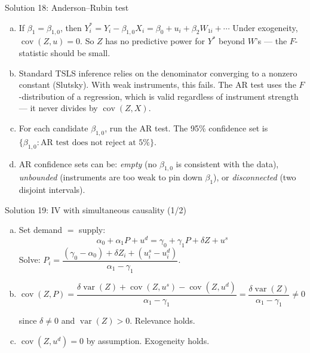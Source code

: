 \documentclass[10pt]{beamer}
\begin{document}
\begin{frame}{Solution 18: Anderson--Rubin test}
\label{s18}
\begin{enumerate}[(a)]
  \item If $\beta_1 = \beta_{1,0}$, then $Y_i^* = Y_i - \beta_{1,0}X_i = \beta_0 + u_i + \beta_2 W_{1i} + \cdots$ Under exogeneity, $\operatorname{cov}(Z, u) = 0$. So $Z$ has no predictive power for $Y^*$ beyond $W$'s --- the $F$-statistic should be small.

  \item Standard TSLS inference relies on the denominator converging to a nonzero constant (Slutsky). With weak instruments, this fails. The AR test uses the $F$-distribution of a regression, which is valid \alert{regardless} of instrument strength --- it never divides by $\operatorname{cov}(Z,X)$.

  \item For each candidate $\beta_{1,0}$, run the AR test. The 95\% confidence set is $\{\beta_{1,0} : \text{AR test does not reject at 5\%}\}$.

  \item AR confidence sets can be: \emph{empty} (no $\beta_{1,0}$ is consistent with the data), \emph{unbounded} (instruments are too weak to pin down $\beta_1$), or \emph{disconnected} (two disjoint intervals).
\end{enumerate}

\vfill
\hfill\hyperlink{q18}{}
\end{frame}

\begin{frame}{Solution 19: IV with simultaneous causality (1/2)}
\label{s19}
\begin{enumerate}[(a)]
  \item Set demand $=$ supply:
  \[
  \alpha_0 + \alpha_1 P + u^d = \gamma_0 + \gamma_1 P + \delta Z + u^s
  \]
  Solve: $\boxed{P_i = \dfrac{(\gamma_0 - \alpha_0) + \delta Z_i + (u_i^s - u_i^d)}{\alpha_1 - \gamma_1}}$.

  \item $\operatorname{cov}(Z, P) = \dfrac{\delta\operatorname{var}(Z) + \operatorname{cov}(Z, u^s) - \operatorname{cov}(Z, u^d)}{\alpha_1 - \gamma_1} = \dfrac{\delta\operatorname{var}(Z)}{\alpha_1 - \gamma_1} \neq 0$

  since $\delta \neq 0$ and $\operatorname{var}(Z) > 0$. \alert{Relevance holds.} \checkmark

  \item $\operatorname{cov}(Z, u^d) = 0$ by assumption. \alert{Exogeneity holds.} \checkmark
\end{enumerate}

\vfill
\hfill\hyperlink{s19b}{}
\hfill\hyperlink{q19}{}
\end{frame}
\end{document}
